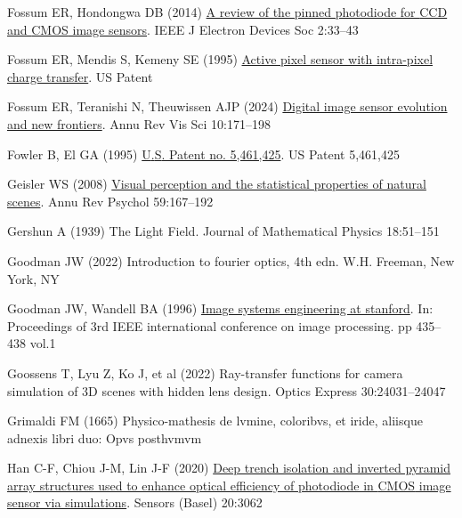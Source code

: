 \documentclass[
  letterpaper,
]{book}
\newlength{\cslhangindent}
\newenvironment{CSLReferences}[2] %
 {\begin{list}{}{%
  \setlength{\itemindent}{0pt}
  \setlength{\leftmargin}{0pt}
  \setlength{\parsep}{0pt}
  \ifodd #1
   \setlength{\leftmargin}{\cslhangindent}
   \setlength{\itemindent}{-1\cslhangindent}
  \fi
  \setlength{\itemsep}{#2\baselineskip}}}
 {\end{list}}
\begin{document}
\begin{CSLReferences}{1}{1}
Fossum ER, Hondongwa DB (2014)
\href{http://dx.doi.org/10.1109/jeds.2014.2306412}{A review of the
pinned photodiode for {CCD} and {CMOS} image sensors}. IEEE J Electron
Devices Soc 2:33--43

Fossum ER, Mendis S, Kemeny SE (1995)
\href{https://patents.google.com/patent/US5471515A/en}{Active pixel
sensor with intra-pixel charge transfer}. US Patent

Fossum ER, Teranishi N, Theuwissen AJP (2024)
\href{http://dx.doi.org/10.1146/annurev-vision-101322-105538}{Digital
image sensor evolution and new frontiers}. Annu Rev Vis Sci 10:171--198

Fowler B, El GA (1995)
\href{https://patentimages.storage.googleapis.com/5e/23/0b/9905270680ea81/US5461425.pdf}{{U}.{S}.
Patent no. 5,461,425}. US Patent 5,461,425

Geisler WS (2008)
\href{http://dx.doi.org/10.1146/annurev.psych.58.110405.085632}{Visual
perception and the statistical properties of natural scenes}. Annu Rev
Psychol 59:167--192

Gershun A (1939) The {Light Field}. Journal of Mathematical Physics
18:51--151

Goodman JW (2022) Introduction to fourier optics, 4th edn. W.H. Freeman,
New York, NY

Goodman JW, Wandell BA (1996)
\href{https://doi.org/10.1109/ICIP.1996.559526}{Image systems
engineering at stanford}. In: Proceedings of 3rd IEEE international
conference on image processing. pp 435--438 vol.1

Goossens T, Lyu Z, Ko J, et al (2022) Ray-transfer functions for camera
simulation of {3D} scenes with hidden lens design. Optics Express
30:24031--24047

Grimaldi FM (1665) Physico-mathesis de lvmine, coloribvs, et iride,
aliisque adnexis libri duo: Opvs posthvmvm

Han C-F, Chiou J-M, Lin J-F (2020)
\href{http://dx.doi.org/10.3390/s20113062}{Deep trench isolation and
inverted pyramid array structures used to enhance optical efficiency of
photodiode in {CMOS} image sensor via simulations}. Sensors (Basel)
20:3062


\end{CSLReferences}
\end{document}
